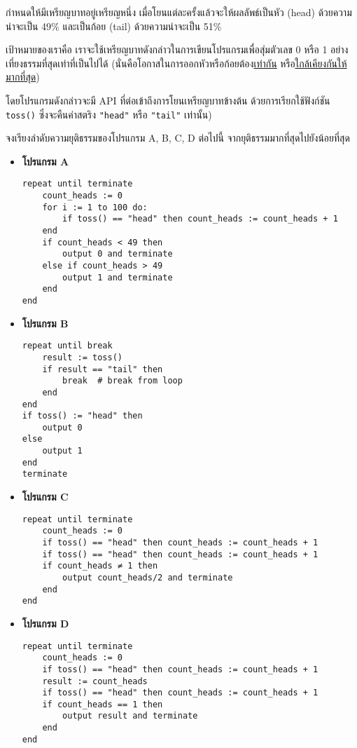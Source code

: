\question{}

กำหนดให้มีเหรียญบาทอยู่เหรียญหนึ่ง เมื่อโยนแต่ละครั้งแล้วจะให้ผลลัพธ์เป็นหัว (head)
ด้วยความน่าจะเป็น 49\% และเป็นก้อย (tail) ด้วยความน่าจะเป็น 51\%

เป้าหมายของเราคือ เราจะใช้เหรียญบาทดังกล่าวในการเขียนโปรแกรมเพื่อสุ่มตัวเลข 0 หรือ 1 
อย่างเที่ยงธรรมที่สุดเท่าที่เป็นไปได้ (นั่นคือโอกาสในการออกหัวหรือก้อยต้อง\uline{เท่ากัน}
หรือ\uline{ใกล้เคียงกันให้มากที่สุด})

โดยโปรแกรมดังกล่าวจะมี API ที่ต่อเข้าถึงการโยนเหรียญบาทข้างต้น ด้วยการเรียกใช้ฟังก์ชัน 
\lstinline{toss()} ซึ่งจะคืนค่าสตริง \lstinline{"head"} หรือ \lstinline{"tail"} เท่านั้น)

จงเรียงลำดับความยุติธรรมของโปรแกรม A, B, C, D ต่อไปนี้ จากยุติธรรมมากที่สุดไปยังน้อยที่สุด

\newpage
\begin{fullwidth}
\begin{itemize}[label={$\triangle$}]
\item \textbf{โปรแกรม A}
\begin{lstlisting}
repeat until terminate
    count_heads := 0
    for i := 1 to 100 do:
        if toss() == "head" then count_heads := count_heads + 1
    end
    if count_heads < 49 then
        output 0 and terminate
    else if count_heads > 49
        output 1 and terminate 
    end
end
\end{lstlisting}
\item \textbf{โปรแกรม B}
\begin{lstlisting}
repeat until break
    result := toss()
    if result == "tail" then
        break  # break from loop
    end
end
if toss() := "head" then
    output 0
else 
    output 1 
end
terminate
\end{lstlisting}
\item \textbf{โปรแกรม C}
\begin{lstlisting}
repeat until terminate
    count_heads := 0
    if toss() == "head" then count_heads := count_heads + 1
    if toss() == "head" then count_heads := count_heads + 1
    if count_heads ≠ 1 then
        output count_heads/2 and terminate
    end
end
\end{lstlisting}
\item \textbf{โปรแกรม D}
\begin{lstlisting}
repeat until terminate
    count_heads := 0
    if toss() == "head" then count_heads := count_heads + 1
    result := count_heads
    if toss() == "head" then count_heads := count_heads + 1
    if count_heads == 1 then
        output result and terminate
    end
end
\end{lstlisting}
\end{itemize}
\end{fullwidth}